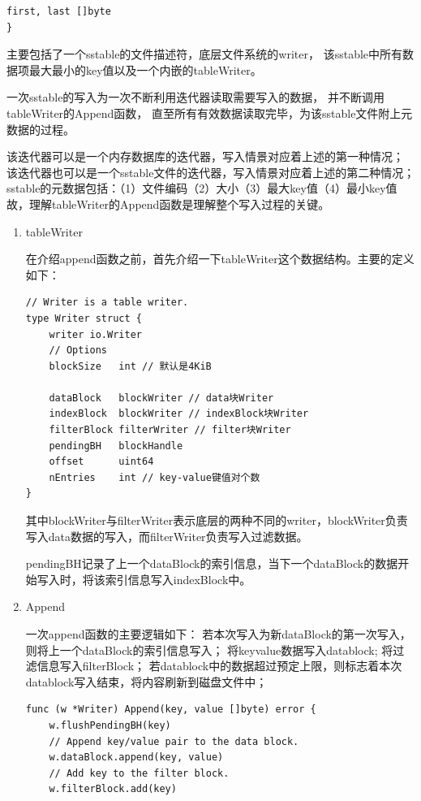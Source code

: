 \begin{enumerate}
\begin{enumerate}
\begin{lstlisting}[caption=tWriter , label=code_radds_storage_tWriter]
	first, last []byte
}
\end{lstlisting}

主要包括了一个sstable的文件描述符，底层文件系统的writer，
该sstable中所有数据项最大最小的key值以及一个内嵌的tableWriter。

一次sstable的写入为一次不断利用迭代器读取需要写入的数据，
并不断调用tableWriter的Append函数，
直至所有有效数据读取完毕，为该sstable文件附上元数据的过程。

该迭代器可以是一个内存数据库的迭代器，写入情景对应着上述的第一种情况；
该迭代器也可以是一个sstable文件的迭代器，写入情景对应着上述的第二种情况；
sstable的元数据包括：（1）文件编码（2）大小（3）最大key值（4）最小key值
故，理解tableWriter的Append函数是理解整个写入过程的关键。


			\begin{enumerate}
				\item tableWriter
				
				在介绍append函数之前，首先介绍一下tableWriter这个数据结构。主要的定义如下：
\begin{lstlisting}[caption=Writer , label=code_radds_storage_Writer]
// Writer is a table writer.
type Writer struct {
	writer io.Writer
	// Options
	blockSize   int // 默认是4KiB

	dataBlock   blockWriter // data块Writer
	indexBlock  blockWriter // indexBlock块Writer
	filterBlock filterWriter // filter块Writer
	pendingBH   blockHandle
	offset      uint64
	nEntries    int // key-value键值对个数
}				
\end{lstlisting}

其中blockWriter与filterWriter表示底层的两种不同的writer，blockWriter负责写入data数据的写入，而filterWriter负责写入过滤数据。

pendingBH记录了上一个dataBlock的索引信息，当下一个dataBlock的数据开始写入时，将该索引信息写入indexBlock中。
				\item Append 
				
				一次append函数的主要逻辑如下：
若本次写入为新dataBlock的第一次写入，则将上一个dataBlock的索引信息写入；
将keyvalue数据写入datablock;
将过滤信息写入filterBlock；
若datablock中的数据超过预定上限，则标志着本次datablock写入结束，将内容刷新到磁盘文件中；

\begin{lstlisting}[caption=Append , label=code_radds_storage_Append]
func (w *Writer) Append(key, value []byte) error {
	w.flushPendingBH(key)
	// Append key/value pair to the data block.
	w.dataBlock.append(key, value)
	// Add key to the filter block.
	w.filterBlock.add(key)
	

\end{lstlisting}
\end{enumerate}
\end{enumerate}
\end{enumerate}
